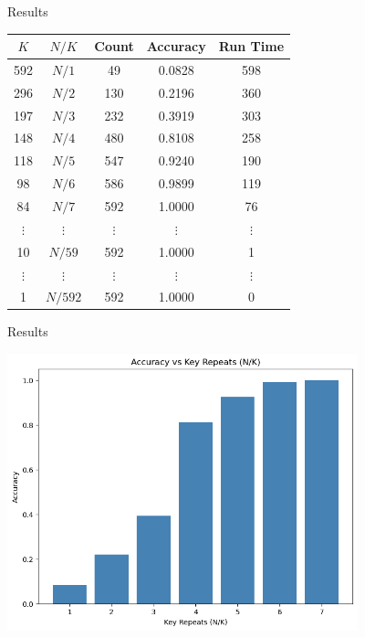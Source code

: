 \documentclass{beamer}
\begin{document}
\begin{frame}{Results}

\begin{center}
\begin{tabular}{ccccc}
\hline
$K$ & $N/K$ & Count & Accuracy & Run Time \\
\hline
592 & $N/1$ & 49   & 0.0828 & 598 \\
296 & $N/2$ & 130  & 0.2196 & 360 \\
197 & $N/3$ & 232  & 0.3919 & 303 \\
148 & $N/4$ & 480  & 0.8108 & 258 \\
118 & $N/5$ & 547  & 0.9240 & 190 \\
98  & $N/6$ & 586  & 0.9899 & 119 \\
84  & $N/7$ & 592  & 1.0000 & 76  \\
$\vdots$ & $\vdots$ & $\vdots$ & $\vdots$ & $\vdots$ \\
10  & $N/59$  & 592 & 1.0000 & 1   \\
$\vdots$ & $\vdots$ & $\vdots$ & $\vdots$ & $\vdots$ \\
1   & $N/592$ & 592 & 1.0000 & 0   \\
\hline
\end{tabular}
\end{center}

\end{frame}


\begin{frame}{Results}

\begin{center} \includegraphics[width=4in]{images/experiment.png} \end{center}

\end{frame}
\end{document}
